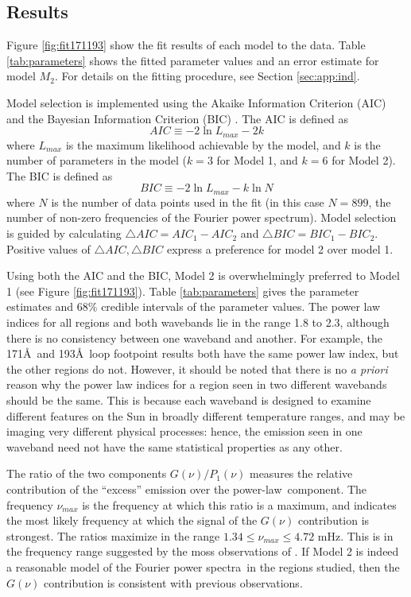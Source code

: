 \documentclass[onecolumn]{emulateapj}
\newcommand{\PA}{power spectra}
\newcommand{\PL}{power-law}
\newcommand{\Fpa}{Fourier \PA}
\begin{document}
\subsection{Results}\label{ssec:results}
Figure \ref{fig:fit171193} show the fit results of each model to the
data.  Table \ref{tab:parameters} shows the fitted parameter values
and an error estimate for model $M_{2}$.  For details on the fitting
procedure, see Section \ref{sec:app:ind}.

Model selection is implemented using the Akaike Information Criterion
(AIC) and the Bayesian Information Criterion (BIC)
\citep{2007MNRAS.377L..74L, WICS:WICS199}.  The AIC is defined as
\begin{equation}\label{eqn:aic}
AIC \equiv -2 \ln L_{max} - 2k
\end{equation}
where $L_{max}$ is the maximum likelihood achievable by the model, and
$k$ is the number of parameters in the model ($k=3$ for Model 1, and
$k=6$ for Model 2).  The BIC is defined as
\begin{equation}\label{eqn:bic}
BIC \equiv -2 \ln L_{max} - k\ln N
\end{equation}
where $N$ is the number of data points used in the fit (in this case
$N=899$, the number of non-zero frequencies of the Fourier power
spectrum).  Model selection is guided by calculating $\triangle AIC =
AIC_{1} - AIC_{2}$ and $\triangle BIC = BIC_{1} - BIC_{2}$.  Positive
values of $\triangle AIC, \triangle BIC$ express a preference for model 2
over model 1.

Using both the AIC and the BIC, Model 2 is overwhelmingly preferred to
Model 1 (see Figure \ref{fig:fit171193}). Table \ref{tab:parameters}
gives the parameter estimates and 68\% credible intervals of the
parameter values.  The power law indices for all regions and both
wavebands lie in the range 1.8 to 2.3, although there is no
consistency between one waveband and another.  For example, the
171\AA\ and 193\AA\ loop footpoint results both have the same power
law index, but the other regions do not.  However, it should be noted
that there is no {\it a priori} reason why the power law indices for a
region seen in two different wavebands should be the same.  This is
because each waveband is designed to examine different features on the
Sun in broadly different temperature ranges, and may be imaging very
different physical processes: hence, the emission seen in one waveband
need not have the same statistical properties as any other.

The ratio of the two components $G(\nu)/P_{1}(\nu)$ measures the
relative contribution of the ``excess'' emission over the
\PL\ component.  The frequency $\nu_{max}$ is the frequency at which
this ratio is a maximum, and indicates the most likely frequency at
which the signal of the $G(\nu)$ contribution is strongest.  The
ratios maximize in the range $1.34 \le \nu_{max} \le 4.72$ mHz.  This
is in the frequency range suggested by the moss observations of
\cite{2003ApJ...595L..63D}.  If Model 2 is indeed a reasonable model
of the \Fpa\ in the regions studied, then the $G(\nu)$ contribution is
consistent with previous observations.
\end{document}
